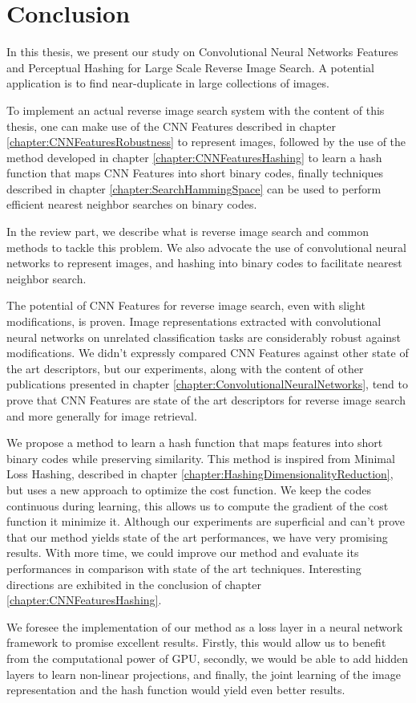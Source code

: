 \chapter{Conclusion}

\label{chapter:Conclusion}


In this thesis, we present our study on Convolutional Neural Networks Features and Perceptual Hashing for Large Scale Reverse Image Search. A potential application is to find near-duplicate in large collections of images.

To implement an actual reverse image search system with the content of this thesis, one can make use of the CNN Features described in chapter \ref{chapter:CNNFeaturesRobustness} to represent images, followed by the use of the method developed in chapter \ref{chapter:CNNFeaturesHashing} to learn a hash function that maps CNN Features into short binary codes, finally techniques described in chapter \ref{chapter:SearchHammingSpace} can be used to perform efficient nearest neighbor searches on binary codes.

In the review part, we describe what is reverse image search and common methods to tackle this problem. We also advocate the use of convolutional neural networks to represent images, and hashing into binary codes to facilitate nearest neighbor search.

The potential of CNN Features for reverse image search, even with slight modifications, is proven. Image representations extracted with convolutional neural networks on unrelated classification tasks are considerably robust against modifications. We didn't expressly compared CNN Features against other state of the art descriptors, but our experiments, along with the content of other publications presented in chapter \ref{chapter:ConvolutionalNeuralNetworks}, tend to prove that CNN Features are state of the art descriptors for reverse image search and more generally for image retrieval.

We propose a method to learn a hash function that maps features into short binary codes while preserving similarity. This method is inspired from Minimal Loss Hashing, described in chapter \ref{chapter:HashingDimensionalityReduction}, but uses a new approach to optimize the cost function. We keep the codes continuous during learning, this allows us to compute the gradient of the cost function it minimize it. Although our experiments are superficial and can't prove that our method yields state of the art performances, we have very promising results. With more time, we could improve our method and evaluate its performances in comparison with state of the art techniques. Interesting directions are exhibited in the conclusion of chapter \ref{chapter:CNNFeaturesHashing}.

We foresee the implementation of our method as a loss layer in a neural network framework to promise excellent results. Firstly, this would allow us to benefit from the computational power of GPU, secondly, we would be able to add hidden layers to learn non-linear projections, and finally, the joint learning of the image representation and the hash function would yield even better results.
